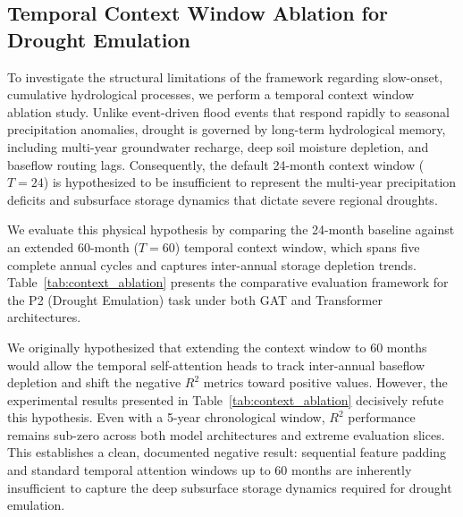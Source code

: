 \documentclass[preprint,12pt]{elsarticle}
\begin{document}
\subsection{Temporal Context Window Ablation for Drought Emulation}
To investigate the structural limitations of the framework regarding slow-onset, cumulative hydrological processes, we perform a temporal context window ablation study. Unlike event-driven flood events that respond rapidly to seasonal precipitation anomalies, drought is governed by long-term hydrological memory, including multi-year groundwater recharge, deep soil moisture depletion, and baseflow routing lags. Consequently, the default 24-month context window ($T=24$) is hypothesized to be insufficient to represent the multi-year precipitation deficits and subsurface storage dynamics that dictate severe regional droughts.

We evaluate this physical hypothesis by comparing the 24-month baseline against an extended 60-month ($T=60$) temporal context window, which spans five complete annual cycles and captures inter-annual storage depletion trends. Table~\ref{tab:context_ablation} presents the comparative evaluation framework for the P2 (Drought Emulation) task under both GAT and Transformer architectures.

\begin{table}[H]
\centering
\caption{Temporal Context Window Ablation Results for P2 (Drought Emulation). Test metrics represent overall $R^2$ and extreme drought slices ($Q_{10}$ and $Q_{05}$), demonstrating that drought emulation fails across all tested temporal windows.}\label{tab:context_ablation}
\end{table}

We originally hypothesized that extending the context window to 60 months would allow the temporal self-attention heads to track inter-annual baseflow depletion and shift the negative $R^2$ metrics toward positive values. However, the experimental results presented in Table~\ref{tab:context_ablation} decisively refute this hypothesis. Even with a 5-year chronological window, $R^2$ performance remains sub-zero across both model architectures and extreme evaluation slices. This establishes a clean, documented negative result: sequential feature padding and standard temporal attention windows up to 60 months are inherently insufficient to capture the deep subsurface storage dynamics required for drought emulation.
\end{document}

